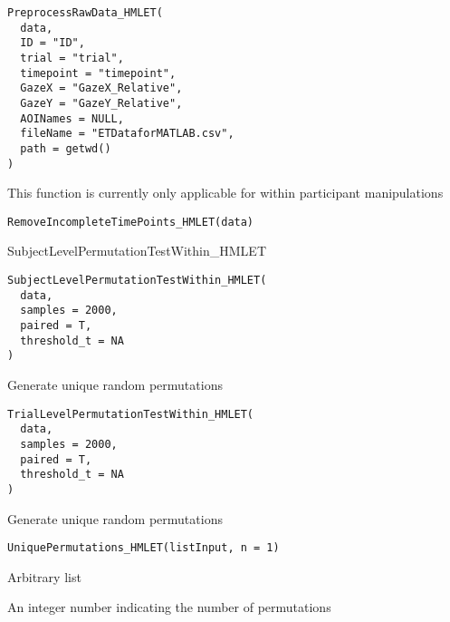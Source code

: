 \documentclass[a4paper]{book}
\begin{document}
%
\begin{Usage}
\begin{verbatim}
PreprocessRawData_HMLET(
  data,
  ID = "ID",
  trial = "trial",
  timepoint = "timepoint",
  GazeX = "GazeX_Relative",
  GazeY = "GazeY_Relative",
  AOINames = NULL,
  fileName = "ETDataforMATLAB.csv",
  path = getwd()
)
\end{verbatim}
\end{Usage}
%
\begin{Description}\relax
This function is currently only applicable for within participant manipulations
\end{Description}
%
\begin{Usage}
\begin{verbatim}
RemoveIncompleteTimePoints_HMLET(data)
\end{verbatim}
\end{Usage}
%
\begin{Description}\relax
SubjectLevelPermutationTestWithin\_HMLET
\end{Description}
%
\begin{Usage}
\begin{verbatim}
SubjectLevelPermutationTestWithin_HMLET(
  data,
  samples = 2000,
  paired = T,
  threshold_t = NA
)
\end{verbatim}
\end{Usage}
%
\begin{Description}\relax
Generate unique random permutations
\end{Description}
%
\begin{Usage}
\begin{verbatim}
TrialLevelPermutationTestWithin_HMLET(
  data,
  samples = 2000,
  paired = T,
  threshold_t = NA
)
\end{verbatim}
\end{Usage}
%
\begin{Description}\relax
Generate unique random permutations
\end{Description}
%
\begin{Usage}
\begin{verbatim}
UniquePermutations_HMLET(listInput, n = 1)
\end{verbatim}
\end{Usage}
%
\begin{Arguments}
\begin{ldescription}
\item[\code{listInput}] Arbitrary list

\item[\code{n}] An integer number indicating the number of permutations
\end{ldescription}
\end{Arguments}
\printindex{}
\end{document}
